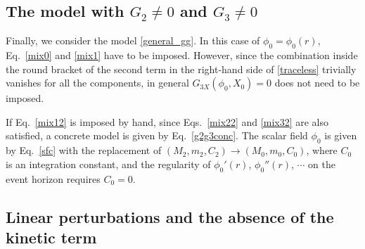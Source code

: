 \documentclass[prd,amsmath,amssymb,floatfix,superscriptaddress,notitlepage,nofootinbib,preprintnumbers]{revtex4-1}
\begin{document}
\subsection{The model with $G_2\neq 0$ and $G_3\neq 0$}
\label{sec43}

Finally, 
we consider the model \eqref{general_gg}.
In this case of $\phi_0=\phi_0(r)$, 
Eq.~\eqref{mix0} and \eqref{mix1} have to be imposed.
However,
since the combination inside the round bracket of 
the second term in the right-hand side of \eqref{traceless}
trivially vanishes for all the components,
in general
$G_{3X}(\phi_0,X_0)=0$ 
does not need to be imposed.


If Eq.~\eqref{mix12} is imposed by hand,
since Eqs.~\eqref{mix22} and \eqref{mix32} are also satisfied, 
a concrete model is given by Eq.~\eqref{g2g3conc}.
The scalar field $\phi_0$ is given by Eq.~\eqref{sfc}
with the replacement of $(M_2,m_2,C_2)\to(M_0,m_0,C_0)$,
where $C_0$ is an integration constant, and the regularity 
of $\phi_0'(r)$, $\phi_0''(r)$, $\cdots$ on the event horizon requires $C_0=0$.



\subsection{Linear perturbations and the absence of the kinetic term}
\label{sec44}
\end{document}
